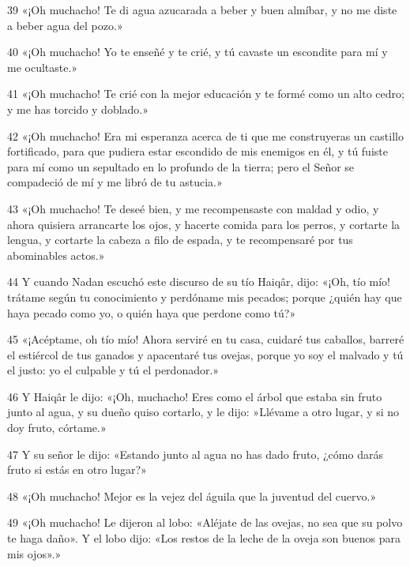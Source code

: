\par 39 «¡Oh muchacho! Te di agua azucarada a beber y buen almíbar, y no me diste a beber agua del pozo.»

\par 40 «¡Oh muchacho! Yo te enseñé y te crié, y tú cavaste un escondite para mí y me ocultaste.»

\par 41 «¡Oh muchacho! Te crié con la mejor educación y te formé como un alto cedro; y me has torcido y doblado.»

\par 42 «¡Oh muchacho! Era mi esperanza acerca de ti que me construyeras un castillo fortificado, para que pudiera estar escondido de mis enemigos en él, y tú fuiste para mí como un sepultado en lo profundo de la tierra; pero el Señor se compadeció de mí y me libró de tu astucia.»

\par 43 «¡Oh muchacho! Te deseé bien, y me recompensaste con maldad y odio, y ahora quisiera arrancarte los ojos, y hacerte comida para los perros, y cortarte la lengua, y cortarte la cabeza a filo de espada, y te recompensaré por tus abominables actos.»

\par 44 Y cuando Nadan escuchó este discurso de su tío Haiqâr, dijo: «¡Oh, tío mío! trátame según tu conocimiento y perdóname mis pecados; porque ¿quién hay que haya pecado como yo, o quién haya que perdone como tú?»

\par 45 «¡Acéptame, oh tío mío! Ahora serviré en tu casa, cuidaré tus caballos, barreré el estiércol de tus ganados y apacentaré tus ovejas, porque yo soy el malvado y tú el justo: yo el culpable y tú el perdonador.»

\par 46 Y Haiqâr le dijo: «¡Oh, muchacho! Eres como el árbol que estaba sin fruto junto al agua, y su dueño quiso cortarlo, y le dijo: »Llévame a otro lugar, y si no doy fruto, córtame.»

\par 47 Y su señor le dijo: «Estando junto al agua no has dado fruto, ¿cómo darás fruto si estás en otro lugar?»

\par 48 «¡Oh muchacho! Mejor es la vejez del águila que la juventud del cuervo.»

\par 49 «¡Oh muchacho! Le dijeron al lobo: «Aléjate de las ovejas, no sea que su polvo te haga daño». Y el lobo dijo: «Los restos de la leche de la oveja son buenos para mis ojos».»

